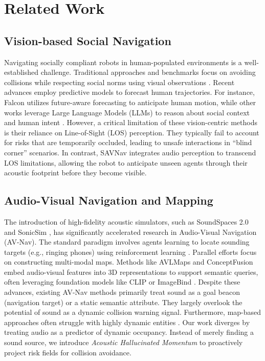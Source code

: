 \section{Related Work}
\label{sec:related_work}

\subsection{Vision-based Social Navigation}
Navigating socially compliant robots in human-populated environments is a well-established challenge. Traditional approaches and benchmarks focus on avoiding collisions while respecting social norms using visual observations \cite{SEANSocialEnvironment2020, SocNavBenchGroundedSimulation2022, IGibsonChallenge2021}. Recent advances employ predictive models to forecast human trajectories. For instance, Falcon \cite{CognitionPrecognitionFutureaware2025} utilizes future-aware forecasting to anticipate human motion, while other works leverage Large Language Models (LLMs) to reason about social context and human intent \cite{CoNavBenchmarkHumancentered2024, OpenNavOpenworldNavigation2025}. 
However, a critical limitation of these vision-centric methods is their reliance on Line-of-Sight (LOS) perception. They typically fail to account for risks that are temporarily occluded, leading to unsafe interactions in ``blind corner'' scenarios. In contrast, SAVNav integrates audio perception to transcend LOS limitations, allowing the robot to anticipate unseen agents through their acoustic footprint before they become visible.

\subsection{Audio-Visual Navigation and Mapping}
The introduction of high-fidelity acoustic simulators, such as SoundSpaces 2.0 \cite{SoundSpaces20Simulation2022} and SonicSim \cite{SonicSimCustomizableSimulation2024}, has significantly accelerated research in Audio-Visual Navigation (AV-Nav). The standard paradigm involves agents learning to locate sounding targets (e.g., ringing phones) using reinforcement learning \cite{LookListenAct2020, AudiovisualNavigationNoisy2025}. Parallel efforts focus on constructing multi-modal maps. Methods like AVLMaps \cite{AudioVisualLanguage2024} and ConceptFusion \cite{ConceptFusionOpensetMultimodal2023} embed audio-visual features into 3D representations to support semantic queries, often leveraging foundation models like CLIP \cite{LearningTransferableVisual2021} or ImageBind \cite{ImageBindOneEmbedding2023}.
Despite these advances, existing AV-Nav methods primarily treat sound as a goal beacon (navigation target) or a static semantic attribute. They largely overlook the potential of sound as a dynamic collision warning signal. Furthermore, map-based approaches often struggle with highly dynamic entities \cite{Multimodal3DMap2024}. Our work diverges by treating audio as a predictor of dynamic occupancy. Instead of merely finding a sound source, we introduce \textit{Acoustic Hallucinated Momentum} to proactively project risk fields for collision avoidance.

